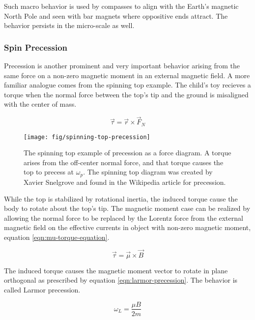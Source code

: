 \noindent 
Such macro behavior is used by compasses to align with the Earth's magnetic North Pole and seen with bar magnets where oppositive ends attract.  The behavior persists in the micro-scale as well.

\subsubsection{Spin Precession}
Precession is another prominent and very important behavior arising from the same force on a non-zero magnetic moment in an external magnetic field.  A more familiar analogue comes from the spinning top example.  The child's toy recieves a torque when the normal force between the top's tip and the ground is misaligned with the center of mass. 

\begin{equation}
\label{eqn:top-torque-equation}
\vec{\tau} = \vec{r} \times \vec{F}_{N}
\end{equation}

\begin{figure}
\label{fig:spinning-top-precession}
\centering
\texttt{[image: fig/spinning-top-precession]}
\caption{The spinning top example of precession as a force diagram.  A torque arises from the off-center normal force, and that torque causes the top to precess at $\omega_p$.  The spinning top diagram was created by Xavier Snelgrove and found in the Wikipedia article for precession.}
\end{figure}

\noindent
While the top is stabilized by rotational inertia, the induced torque cause the body to rotate about the top's tip.  The magnetic moment case can be realized by allowing the normal force to be replaced by the Lorentz force from the external magnetic field on the effective currents in object with non-zero magnetic moment, equation \ref{eqn:mu-torque-equation}.

\begin{equation}
\label{eqn:mu-torque-equation}
\vec{\tau} = \vec{\mu} \times \vec{B}
\end{equation}

\noindent
The induced torque causes the magnetic moment vector to rotate in plane orthogonal as prescribed by equation \ref{eqn:larmor-precession}. The behavior is called Larmor precession.

\begin{equation}
\label{eqn:larmor-precession}
\omega_L = \frac{\mu B}{2 m}
\end{equation}

